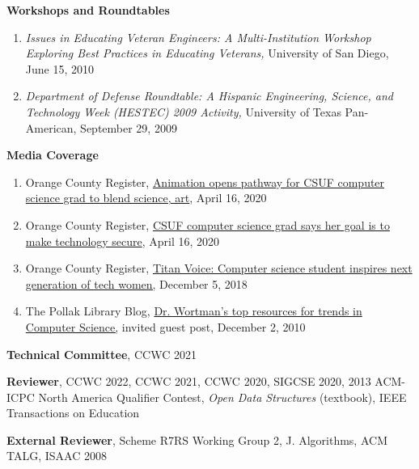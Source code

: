 \documentclass[11pt]{letter}
\begin{document}
\textbf{Workshops and Roundtables}
\begin{enumerate}
\item \emph{Issues in Educating Veteran Engineers: A Multi-Institution Workshop Exploring Best Practices in Educating Veterans,} University of San Diego, June 15, 2010
\item \emph{Department of Defense Roundtable: A Hispanic Engineering, Science, and Technology Week (HESTEC) 2009 Activity,} University of Texas Pan-American, September 29, 2009
\end{enumerate}

\textbf{Media Coverage}
\begin{enumerate}
\item Orange County Register, \href{https://www.ocregister.com/2020/04/16/animation-opens-pathway-for-csuf-computer-science-grad-to-blend-science-and-art/}{Animation opens pathway for CSUF computer science grad to blend science, art}, April 16, 2020
\item Orange County Register, \href{https://www.ocregister.com/2020/04/16/csuf-computer-science-grad-says-her-goal-is-to-make-technology-secure/}{CSUF computer science grad says her goal is to make technology secure}, April 16, 2020
\item Orange County Register, \href{https://www.ocregister.com/2018/12/05/titan-voice-computer-science-student-inspires-next-generation-of-tech-women/}{Titan Voice: Computer science student inspires next generation of tech women,} December 5, 2018
\item The Pollak Library Blog, \href{http://libphp2006.fullerton.edu/blogs/news/2010/12/02/dr-wortmans-top-resources-for-trends-in-computer-science/}{Dr. Wortman's top resources for trends in Computer Science,} invited guest post, December 2, 2010
\end{enumerate}

\textbf{Technical Committee}, CCWC 2021

\textbf{Reviewer}, CCWC 2022, CCWC 2021, CCWC 2020, SIGCSE 2020, 2013 ACM-ICPC North America Qualifier Contest, \emph{Open Data Structures} (textbook), IEEE Transactions on Education

\textbf{External Reviewer}, Scheme R7RS Working Group 2, J. Algorithms, ACM TALG, ISAAC 2008

\end{document}
